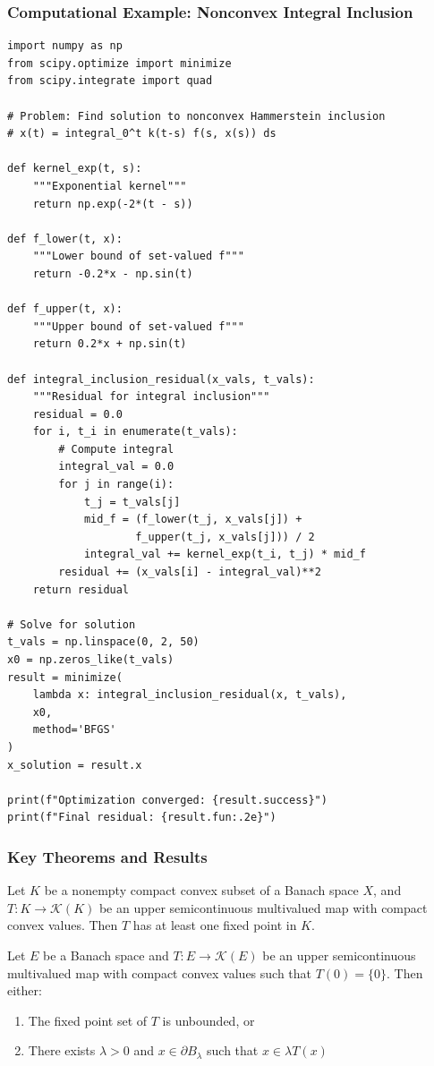\documentclass[aspectratio=169,10pt]{beamer}
\begin{document}
\begin{frame}[fragile]
\frametitle{Computational Example: Nonconvex Integral Inclusion}

\begin{lstlisting}
import numpy as np
from scipy.optimize import minimize
from scipy.integrate import quad

# Problem: Find solution to nonconvex Hammerstein inclusion
# x(t) = integral_0^t k(t-s) f(s, x(s)) ds

def kernel_exp(t, s):
    """Exponential kernel"""
    return np.exp(-2*(t - s))

def f_lower(t, x):
    """Lower bound of set-valued f"""
    return -0.2*x - np.sin(t)

def f_upper(t, x):
    """Upper bound of set-valued f"""
    return 0.2*x + np.sin(t)

def integral_inclusion_residual(x_vals, t_vals):
    """Residual for integral inclusion"""
    residual = 0.0
    for i, t_i in enumerate(t_vals):
        # Compute integral
        integral_val = 0.0
        for j in range(i):
            t_j = t_vals[j]
            mid_f = (f_lower(t_j, x_vals[j]) +
                    f_upper(t_j, x_vals[j])) / 2
            integral_val += kernel_exp(t_i, t_j) * mid_f
        residual += (x_vals[i] - integral_val)**2
    return residual

# Solve for solution
t_vals = np.linspace(0, 2, 50)
x0 = np.zeros_like(t_vals)
result = minimize(
    lambda x: integral_inclusion_residual(x, t_vals),
    x0,
    method='BFGS'
)
x_solution = result.x

print(f"Optimization converged: {result.success}")
print(f"Final residual: {result.fun:.2e}")
\end{lstlisting}

\end{frame}

\begin{frame}
\frametitle{Key Theorems and Results}

\begin{theorem}
Let $K$ be a nonempty compact convex subset of a Banach space $X$, and $T: K \to \mathcal{K}(K)$ be an upper semicontinuous multivalued map with compact convex values. Then $T$ has at least one fixed point in $K$.
\end{theorem}

\vspace{0.5cm}

\begin{theorem}
Let $E$ be a Banach space and $T: E \to \mathcal{K}(E)$ be an upper semicontinuous multivalued map with compact convex values such that $T(0) = \{0\}$. Then either:
\begin{enumerate}
    \item The fixed point set of $T$ is unbounded, or
    \item There exists $\lambda > 0$ and $x \in \partial B_\lambda$ such that $x \in \lambda T(x)$
\end{enumerate}
\end{theorem}

\end{frame}
\end{document}
